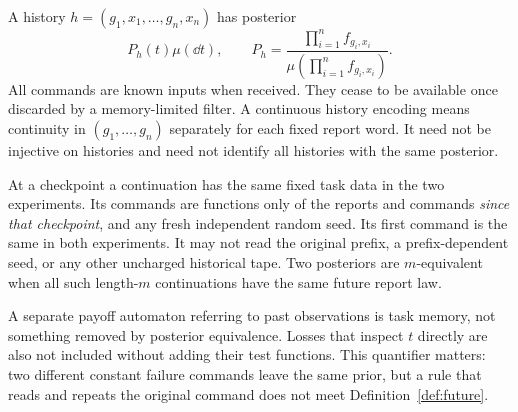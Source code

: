 A history $h=(g_1,x_1,\ldots,g_n,x_n)$ has posterior
\begin{equation}\label{eq:posterior}
 P_h(t)\mu(\dd t),\qquad
 P_h=\frac{\prod_{i=1}^nf_{g_i,x_i}}{\mu(\prod_{i=1}^nf_{g_i,x_i})}.
\end{equation}
All commands are known inputs when received. They cease to be available
once discarded by a memory-limited filter. A continuous history encoding
means continuity in $(g_1,\ldots,g_n)$ separately for each fixed report
word. It need not be injective on histories and need not identify all
histories with the same posterior.

\begin{definition}\label{def:future}
At a checkpoint a continuation has the same fixed task data in the two
experiments. Its commands are functions only of the reports and commands
\emph{since that checkpoint}, and any fresh independent random seed. Its
first command is the same in both experiments. It may not read the
original prefix, a prefix-dependent seed, or any other uncharged historical
tape. Two posteriors are $m$-equivalent when all such length-$m$
continuations have the same future report law.
\end{definition}

A separate payoff automaton referring to past observations is task memory,
not something removed by posterior equivalence. Losses that inspect $t$
directly are also not included without adding their test functions. This
quantifier matters: two different constant failure commands leave the
same prior, but a rule that reads and repeats the original command does
not meet Definition~\ref{def:future}.

